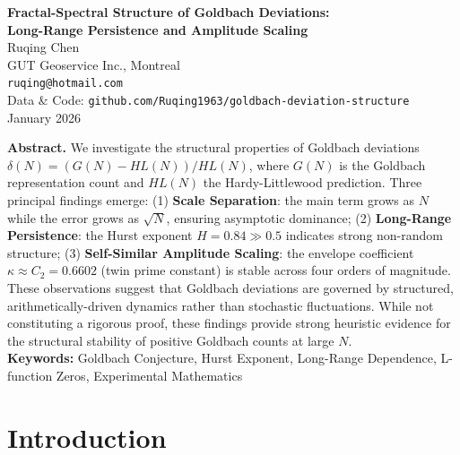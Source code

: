 \documentclass[10pt,twocolumn]{article}
\begin{document}
\begin{center}
{\Large\bfseries Fractal-Spectral Structure of Goldbach Deviations:}\\[0.3em]
{\Large\bfseries Long-Range Persistence and Amplitude Scaling}\\[1em]
{\normalsize Ruqing Chen}\\[0.3em]
{\small GUT Geoservice Inc., Montreal}\\
{\small\texttt{ruqing@hotmail.com}}\\[0.2em]
{\small Data \& Code: \texttt{github.com/Ruqing1963/goldbach-deviation-structure}}\\[0.5em]
{\small January 2026}\\[0.3em]
\end{center}

\vspace{0.5em}
\noindent\textbf{Abstract.} 
We investigate the structural properties of Goldbach deviations $\delta(N) = (G(N)-HL(N))/HL(N)$, where $G(N)$ is the Goldbach representation count and $HL(N)$ the Hardy-Littlewood prediction. Three principal findings emerge: (1) \textbf{Scale Separation}: the main term grows as $N$ while the error grows as $\sqrt{N}$, ensuring asymptotic dominance; (2) \textbf{Long-Range Persistence}: the Hurst exponent $H=0.84\gg0.5$ indicates strong non-random structure; (3) \textbf{Self-Similar Amplitude Scaling}: the envelope coefficient $\kappa\approx C_2=0.6602$ (twin prime constant) is stable across four orders of magnitude. These observations suggest that Goldbach deviations are governed by structured, arithmetically-driven dynamics rather than stochastic fluctuations. While not constituting a rigorous proof, these findings provide strong heuristic evidence for the structural stability of positive Goldbach counts at large $N$.\\[0.3em]
\noindent\textbf{Keywords:} Goldbach Conjecture, Hurst Exponent, Long-Range Dependence, L-function Zeros, Experimental Mathematics
\vspace{0.8em}

\section{Introduction}
\end{document}
